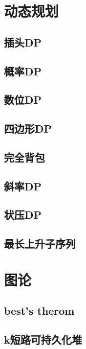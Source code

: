 \documentclass[UTF8]{ctexart}
\begin{document}
\section{动态规划}
\subsection{插头DP}

\subsection{概率DP}

\subsection{数位DP}

\subsection{四边形DP}

\subsection{完全背包}

\subsection{斜率DP}

\subsection{状压DP}

\subsection{最长上升子序列}

\section{图论}
\subsection{best's therom}

\subsection{k短路可持久化堆}

\end{document}

